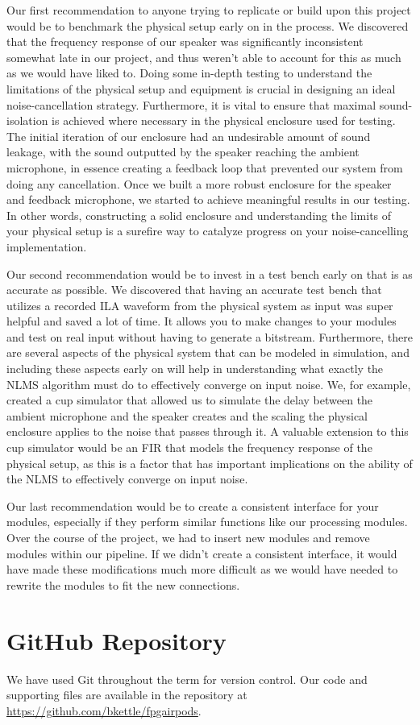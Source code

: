\documentclass{fpgairpods}
\begin{document}
Our first recommendation to anyone trying to replicate or build upon this project would be to benchmark the physical setup early on in the process. We discovered that the frequency response of our speaker was significantly inconsistent somewhat late in our project, and thus weren't able to account for this as much as we would have liked to. Doing some in-depth testing to understand the limitations of the physical setup and equipment is crucial in designing an ideal noise-cancellation strategy. Furthermore, it is vital to ensure that maximal sound-isolation is achieved where necessary in the physical enclosure used for testing. The initial iteration of our enclosure had an undesirable amount of sound leakage, with the sound outputted by the speaker reaching the ambient microphone, in essence creating a feedback loop that prevented our system from doing any cancellation. Once we built a more robust enclosure for the speaker and feedback microphone, we started to achieve meaningful results in our testing. In other words, constructing a solid enclosure and understanding the limits of your physical setup is a surefire way to catalyze progress on your noise-cancelling implementation.


Our second recommendation would be to invest in a test bench early on that is as accurate as possible. We discovered that having an accurate test bench that utilizes a recorded ILA waveform from the physical system as input was super helpful and saved a lot of time. It allows you to make changes to your modules and test on real input without having to generate a bitstream. Furthermore, there are several aspects of the physical system that can be modeled in simulation, and including these aspects early on will help in understanding what exactly the NLMS algorithm must do to effectively converge on input noise. We, for example, created a cup simulator that allowed us to simulate the delay between the ambient microphone and the speaker creates and the scaling the physical enclosure applies to the noise that passes through it. A valuable extension to this cup simulator would be an FIR that models the frequency response of the physical setup, as this is a factor that has important implications on the ability of the NLMS to effectively converge on input noise.

Our last recommendation would be to create a consistent interface for your modules, especially if they perform similar functions like our processing modules. Over the course of the project, we had to insert new modules and remove modules within our pipeline. If we didn't create a consistent interface, it would have made these modifications much more difficult as we would have needed to rewrite the modules to fit the new connections.

\appendix
\section{GitHub Repository}
We have used Git throughout the term for version control. Our code and supporting files are available in the repository at \url{https://github.com/bkettle/fpgairpods}.

\printbibliography
\end{document}
